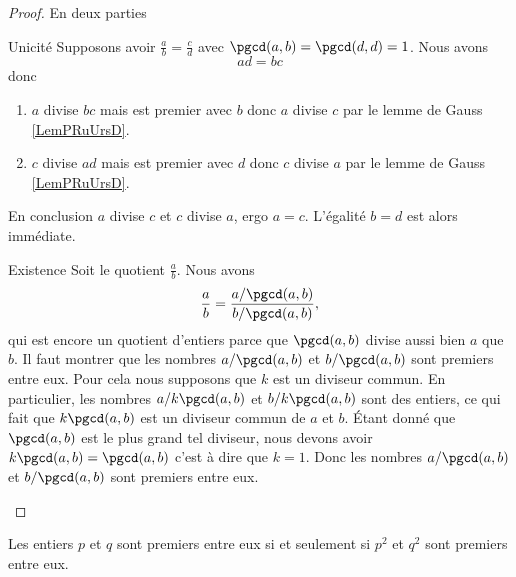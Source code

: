 \begin{proof}
    En deux parties
    \begin{subproof}
        \item[Unicité]
            Supposons avoir \( \frac{ a }{ b }=\frac{ c }{ d }\) avec \( \pgcd(a,b)=\pgcd(d,d)=1\). Nous avons 
            \begin{equation}
                ad=bc
            \end{equation}
            donc
            \begin{enumerate}
                \item
                    \( a\) divise \( bc\) mais est premier avec \( b\) donc \( a\) divise \( c\) par le lemme de Gauss \ref{LemPRuUrsD}.
                \item
                    \( c\) divise \( ad\) mais est premier avec \( d\) donc \( c\) divise \( a\) par le lemme de Gauss \ref{LemPRuUrsD}.
            \end{enumerate}
            En conclusion \( a\) divise \( c\) et \( c\) divise \( a\), ergo \( a=c\). L'égalité \( b=d\) est alors immédiate.
        \item[Existence]
            Soit le quotient \( \frac{ a }{ b }\). Nous avons
            \begin{equation}
                \frac{ a }{ b }=\frac{ a/\pgcd(a,b) }{ b/\pgcd(a,b) },
            \end{equation}
            qui est encore un quotient d'entiers parce que \( \pgcd(a,b)\) divise aussi bien \( a\) que \( b\). Il faut montrer que les nombres \( a/\pgcd(a,b)\) et \( b/\pgcd(a,b)\) sont premiers entre eux. Pour cela nous supposons que \( k\) est un diviseur commun. En particulier, les nombres \( a/k\pgcd(a,b)\) et \( b/k\pgcd(a,b)\) sont des entiers, ce qui fait que \( k\pgcd(a,b)\) est un diviseur commun de \( a\) et \( b\). Étant donné que \( \pgcd(a,b)\) est le plus grand tel diviseur, nous devons avoir \( k\pgcd(a,b)=\pgcd(a,b)\) c'est à dire que \( k=1\). Donc les nombres \( a/\pgcd(a,b)\) et \( b/\pgcd(a,b)\) sont premiers entre eux.
    \end{subproof}
\end{proof}

\begin{proposition}     \label{PROPooRZDDooLJabov}
    Les entiers \( p\) et \( q\) sont premiers entre eux si et seulement si \( p^2\) et \( q^2\) sont premiers entre eux.
\end{proposition}

